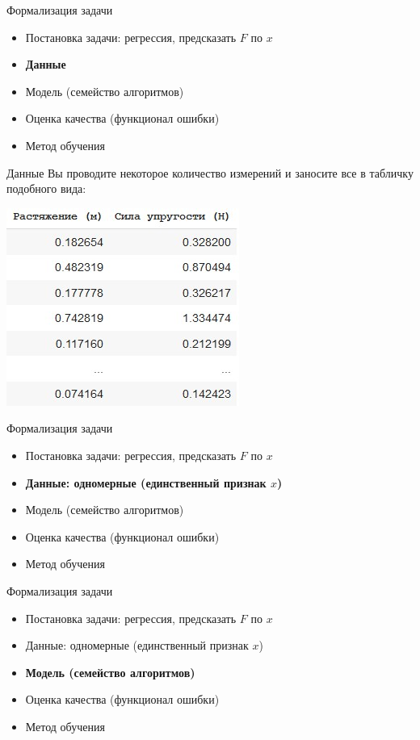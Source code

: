 \documentclass[aspectratio=169]{beamer}
\begin{document}
\begin{frame}{Формализация задачи}
    \begin{itemize}
        \item Постановка задачи: регрессия, предсказать \( F \) по \( x \)
        \item \textbf{Данные}
        \item Модель (семейство алгоритмов)
        \item Оценка качества (функционал ошибки)
        \item Метод обучения
    \end{itemize}
\end{frame}

\begin{frame}{Данные}
    Вы проводите некоторое количество измерений и заносите все в табличку подобного вида:
    \begin{center}
        \includegraphics[width=.42\linewidth]{figures/fig3.jpg}
    \end{center}
\end{frame}

\begin{frame}{Формализация задачи}
    \begin{itemize}
        \item Постановка задачи: регрессия, предсказать \( F \) по \( x \)
        \item \textbf{Данные: одномерные (единственный признак \( x \))}
        \item Модель (семейство алгоритмов)
        \item Оценка качества (функционал ошибки)
        \item Метод обучения
    \end{itemize}
\end{frame}

\begin{frame}{Формализация задачи}
    \begin{itemize}
        \item Постановка задачи: регрессия, предсказать \( F \) по \( x \)
        \item Данные: одномерные (единственный признак \( x \))
        \item \textbf{Модель (семейство алгоритмов)}
        \item Оценка качества (функционал ошибки)
        \item Метод обучения
    \end{itemize}
\end{frame}
\end{document}
